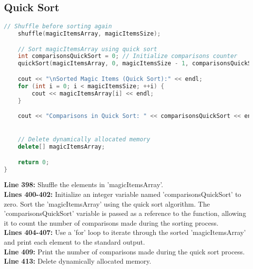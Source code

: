 \documentclass[letterpaper, 10pt,DIV=13]{scrartcl}
\numberwithin{equation}{section} %
\numberwithin{figure}{section} %
\numberwithin{table}{section} %
\begin{document}
\subsection{Quick Sort}
\begin{linenumbers}
\begin{lstlisting}[language=C++, caption={Quick Sort}, label={code:example}]
    // Shuffle before sorting again
    shuffle(magicItemsArray, magicItemsSize);

    // Sort magicItemsArray using quick sort
    int comparisonsQuickSort = 0; // Initialize comparisons counter
    quickSort(magicItemsArray, 0, magicItemsSize - 1, comparisonsQuickSort);

    cout << "\nSorted Magic Items (Quick Sort):" << endl;
    for (int i = 0; i < magicItemsSize; ++i) {
        cout << magicItemsArray[i] << endl;
    }

    cout << "Comparisons in Quick Sort: " << comparisonsQuickSort << endl;


    // Delete dynamically allocated memory
    delete[] magicItemsArray;

    return 0;
}
\end{lstlisting}
\end{linenumbers}
\nolinenumbers

\textbf{Line 398:} Shuffle the elements in 'magicItemsArray'. \\
\textbf{Lines 400-402:} Initialize an integer variable named 'comparisonsQuickSort' to zero. Sort the 'magicItemsArray' using the quick sort algorithm. The 'comparisonsQuickSort' variable is passed as a reference to the function, allowing it to count the number of comparisons made during the sorting process. \\
\textbf{Lines 404-407:} Use a 'for' loop to iterate through the sorted 'magicItemsArray' and print each element to the standard output. \\
\textbf{Line 409:} Print the number of comparisons made during the quick sort process. \\
\textbf{Line 413:} Delete dynamically allocated memory.


\pagebreak

\end{document}

